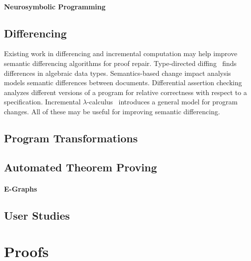 \paragraph{Neurosymbolic Programming}

\subsection{Differencing}
\label{sec:diff-incremental}

Existing work in differencing and incremental computation may help 
improve semantic differencing algorithms for proof repair.
Type-directed diffing~\cite{Miraldo:2017:TDS:3122975.3122976}
finds differences in algebraic data types.
Semantics-based change impact analysis~\cite{Autexier:2010:SCI:1860559.1860580} models semantic differences
between documents.
Differential assertion checking~\cite{differential-assertion-checking-2} analyzes different
versions of a program for relative correctness with respect to a specification.
Incremental $\lambda$-calculus~\cite{Cai:2014:TCH:2594291.2594304} introduces a general model for program changes.
All of these may be useful for improving semantic differencing.

\subsection{Program Transformations}
\label{sec:rel-transformation}

\subsection{Automated Theorem Proving}
\label{sec:atp}


\paragraph{E-Graphs}

\subsection{User Studies}
\label{sec:user-studies}


\iffalse

\section{Proofs}


